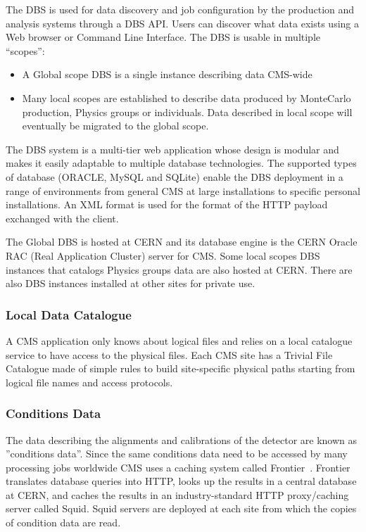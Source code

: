 The DBS is used for data discovery and job configuration by the production and analysis systems through a DBS API. 
Users can discover what data exists using a Web browser or Command Line Interface.
The DBS is usable in multiple “scopes”:
\begin{itemize}
\item A Global scope DBS is a single instance describing data CMS-wide %
\item Many local scopes are established to describe data produced by MonteCarlo production, Physics groups or individuals. Data described in local scope will eventually be migrated to the global scope. 
\end{itemize}
The DBS system is a multi-tier web application whose design is modular and makes it easily adaptable to multiple database technologies. The supported types of database (ORACLE, MySQL and SQLite) enable the DBS deployment in a range of environments from general CMS at large installations to specific personal installations.
An XML format is used for the format of the HTTP payload exchanged with the client.

The Global DBS is hosted at CERN and its database engine is the CERN Oracle RAC (Real Application Cluster) server for CMS. Some local scopes DBS instances that catalogs Physics groups data are also hosted at CERN. There are also DBS instances installed at other sites for private use. 

\subsubsection{Local Data Catalogue}
\label{sec:3_1_2}
A CMS application only knows about logical files and relies on a local catalogue service to have access to the physical files.
Each CMS site has a Trivial File Catalogue made of simple rules to build site-specific physical paths starting from logical file names and access protocols.

\subsubsection{Conditions Data}
\label{sec:3_1_3}
The data describing the alignments and calibrations of the detector are known as ''conditions data''. Since the same conditions data need to be accessed by many processing jobs worldwide CMS uses a caching system called Frontier~\cite{RefFrontier}.
Frontier translates database queries into HTTP, looks up the results in a central database at CERN, and caches the results in an industry-standard HTTP proxy/caching server called Squid. Squid servers are deployed at each site from which the copies of condition data are read.

